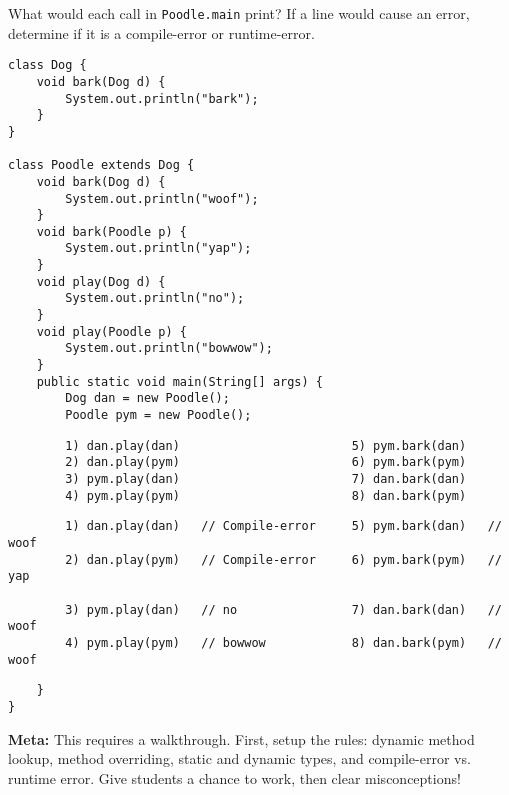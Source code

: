 \begin{blocksection}
\question What would each call in \lstinline$Poodle.main$ print? If a line
would cause an error, determine if it is a compile-error or runtime-error.

\begin{lstlisting}
class Dog {
    void bark(Dog d) {
        System.out.println("bark");
    }
}

class Poodle extends Dog {
    void bark(Dog d) {
        System.out.println("woof");
    }
    void bark(Poodle p) {
        System.out.println("yap");
    }
    void play(Dog d) {
        System.out.println("no");
    }
    void play(Poodle p) {
        System.out.println("bowwow");
    }
    public static void main(String[] args) {
        Dog dan = new Poodle();
        Poodle pym = new Poodle();
\end{lstlisting}
\ifprintanswers\else
\begin{lstlisting}
        1) dan.play(dan)                        5) pym.bark(dan)
        2) dan.play(pym)                        6) pym.bark(pym)
        3) pym.play(dan)                        7) dan.bark(dan)
        4) pym.play(pym)                        8) dan.bark(pym)
\end{lstlisting}
\fi
\begin{solution}
\begin{lstlisting}
        1) dan.play(dan)   // Compile-error     5) pym.bark(dan)   // woof
        2) dan.play(pym)   // Compile-error     6) pym.bark(pym)   // yap

        3) pym.play(dan)   // no                7) dan.bark(dan)   // woof
        4) pym.play(pym)   // bowwow            8) dan.bark(pym)   // woof
\end{lstlisting}
\end{solution}
\begin{lstlisting}
    }
}
\end{lstlisting}
\end{blocksection}

\begin{solution}
\textbf{Meta:} This requires a walkthrough. First, setup the rules: dynamic
method lookup, method overriding, static and dynamic types, and compile-error
vs. runtime error. Give students a chance to work, then clear misconceptions!
\end{solution}
